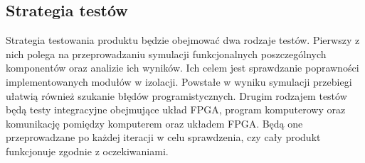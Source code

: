 \subsection{Strategia testów}
Strategia testowania produktu będzie obejmować dwa rodzaje testów. Pierwszy z nich polega na przeprowadzaniu symulacji funkcjonalnych poszczególnych komponentów oraz analizie ich wyników. Ich celem jest sprawdzanie poprawności implementowanych modułów w izolacji. Powstałe w wyniku symulacji przebiegi ułatwią również szukanie błędów programistycznych. Drugim rodzajem testów będą testy integracyjne obejmujące układ FPGA, program komputerowy oraz komunikację pomiędzy komputerem oraz układem FPGA. Będą one przeprowadzane po każdej iteracji w celu sprawdzenia, czy cały produkt funkcjonuje zgodnie z oczekiwaniami.


\newpage